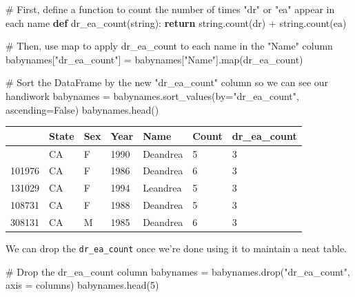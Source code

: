 \documentclass[
  letterpaper,
  DIV=11,
  numbers=noendperiod]{scrreprt}
\newenvironment{Shaded}{\begin{snugshade}}{\end{snugshade}}
\newcommand{\BuiltInTok}[1]{\textcolor[rgb]{0.00,0.23,0.31}{#1}}
\newcommand{\CommentTok}[1]{\textcolor[rgb]{0.37,0.37,0.37}{#1}}
\newcommand{\ControlFlowTok}[1]{\textcolor[rgb]{0.00,0.23,0.31}{\textbf{#1}}}
\newcommand{\DecValTok}[1]{\textcolor[rgb]{0.68,0.00,0.00}{#1}}
\newcommand{\KeywordTok}[1]{\textcolor[rgb]{0.00,0.23,0.31}{\textbf{#1}}}
\newcommand{\NormalTok}[1]{\textcolor[rgb]{0.00,0.23,0.31}{#1}}
\newcommand{\OperatorTok}[1]{\textcolor[rgb]{0.37,0.37,0.37}{#1}}
\newcommand{\StringTok}[1]{\textcolor[rgb]{0.13,0.47,0.30}{#1}}
\newcommand{\VariableTok}[1]{\textcolor[rgb]{0.07,0.07,0.07}{#1}}
\begin{document}
\begin{Shaded}
\begin{Highlighting}[]
\CommentTok{\# First, define a function to count the number of times "dr" or "ea" appear in each name}
\KeywordTok{def}\NormalTok{ dr\_ea\_count(string):}
    \ControlFlowTok{return}\NormalTok{ string.count(}\StringTok{\textquotesingle{}dr\textquotesingle{}}\NormalTok{) }\OperatorTok{+}\NormalTok{ string.count(}\StringTok{\textquotesingle{}ea\textquotesingle{}}\NormalTok{)}

\CommentTok{\# Then, use \textasciigrave{}map\textasciigrave{} to apply \textasciigrave{}dr\_ea\_count\textasciigrave{} to each name in the "Name" column}
\NormalTok{babynames[}\StringTok{"dr\_ea\_count"}\NormalTok{] }\OperatorTok{=}\NormalTok{ babynames[}\StringTok{"Name"}\NormalTok{].}\BuiltInTok{map}\NormalTok{(dr\_ea\_count)}

\CommentTok{\# Sort the DataFrame by the new "dr\_ea\_count" column so we can see our handiwork}
\NormalTok{babynames }\OperatorTok{=}\NormalTok{ babynames.sort\_values(by}\OperatorTok{=}\StringTok{"dr\_ea\_count"}\NormalTok{, ascending}\OperatorTok{=}\VariableTok{False}\NormalTok{)}
\NormalTok{babynames.head()}
\end{Highlighting}
\end{Shaded}

\begin{longtable}[]{@{}lllllll@{}}
\toprule\noalign{}
& State & Sex & Year & Name & Count & dr\_ea\_count \\
\midrule\noalign{}
\endhead
\bottomrule\noalign{}
\endlastfoot
115957 & CA & F & 1990 & Deandrea & 5 & 3 \\
101976 & CA & F & 1986 & Deandrea & 6 & 3 \\
131029 & CA & F & 1994 & Leandrea & 5 & 3 \\
108731 & CA & F & 1988 & Deandrea & 5 & 3 \\
308131 & CA & M & 1985 & Deandrea & 6 & 3 \\
\end{longtable}

We can drop the \texttt{dr\_ea\_count} once we're done using it to
maintain a neat table.

\begin{Shaded}
\begin{Highlighting}[]
\CommentTok{\# Drop the \textasciigrave{}dr\_ea\_count\textasciigrave{} column}
\NormalTok{babynames }\OperatorTok{=}\NormalTok{ babynames.drop(}\StringTok{"dr\_ea\_count"}\NormalTok{, axis }\OperatorTok{=} \StringTok{\textquotesingle{}columns\textquotesingle{}}\NormalTok{)}
\NormalTok{babynames.head(}\DecValTok{5}\NormalTok{)}
\end{Highlighting}
\end{Shaded}
\end{document}
